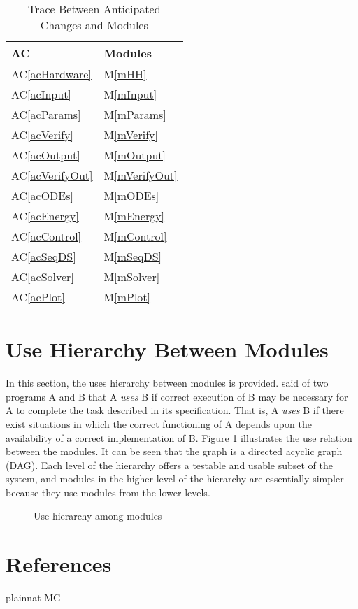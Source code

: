 \documentclass[12pt, titlepage]{article}
\newcommand{\newSection}[1]{
  \newpage
  \section{#1}
}
\newcommand{\acref}[1]{AC\ref{#1}}
\newcommand{\mref}[1]{M\ref{#1}}
\begin{document}
\begin{table}[H]
	\centering
	\begin{tabular}{p{} p{}}

		\toprule
		\textbf{AC} & \textbf{Modules}\\
		\midrule

		\acref{acHardware} & \mref{mHH}\\
		\acref{acInput} & \mref{mInput}\\
		\acref{acParams} & \mref{mParams}\\
		\acref{acVerify} & \mref{mVerify}\\
		\acref{acOutput} & \mref{mOutput}\\
		\acref{acVerifyOut} & \mref{mVerifyOut}\\
		\acref{acODEs} & \mref{mODEs}\\
		\acref{acEnergy} & \mref{mEnergy}\\
		\acref{acControl} & \mref{mControl}\\
		\acref{acSeqDS} & \mref{mSeqDS}\\
		\acref{acSolver} & \mref{mSolver}\\
		\acref{acPlot} & \mref{mPlot}\\

		\bottomrule
	\end{tabular}

	\caption{Trace Between Anticipated Changes and Modules}
	\label{TblACT}
\end{table}

\newSection{Use Hierarchy Between Modules} \label{SecUse}

	In this section, the uses hierarchy between modules is provided. \citet{Parnas1978} said of two programs A and B that A {\em uses} B if correct execution of B may be necessary for A to complete the task described in its specification. That is, A {\em uses} B if there exist situations in which the correct functioning of A depends upon the availability of a correct implementation of B.  Figure \ref{FigUH} illustrates the use relation between the modules. It can be seen that the graph is a directed acyclic graph (DAG). Each level of the hierarchy offers a testable and usable subset of the system, and modules in the higher level of the hierarchy are essentially simpler because they use modules from the lower levels.

	\begin{figure}[H]
		\centering
		\caption{Use hierarchy among modules}
		\label{FigUH}
	\end{figure}

\newSection{References}

	 {plainnat}
	 {MG}
\end{document}

